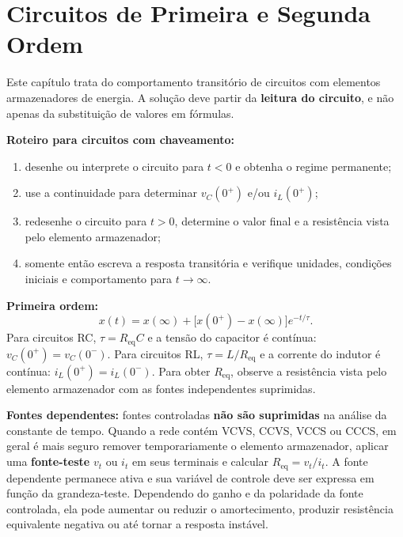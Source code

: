 \section{Circuitos de Primeira e Segunda Ordem}

\begin{conceito}
Este capítulo trata do comportamento transitório de circuitos com elementos
armazenadores de energia. A solução deve partir da \textbf{leitura do circuito},
e não apenas da substituição de valores em fórmulas.

\textbf{Roteiro para circuitos com chaveamento:}
\begin{enumerate}[leftmargin=1.8em,itemsep=2pt,topsep=3pt]
\item desenhe ou interprete o circuito para $t<0$ e obtenha o regime permanente;
\item use a continuidade para determinar $v_C(0^+)$ e/ou $i_L(0^+)$;
\item redesenhe o circuito para $t>0$, determine o valor final e a resistência
      vista pelo elemento armazenador;
\item somente então escreva a resposta transitória e verifique unidades,
      condições iniciais e comportamento para $t\to\infty$.
\end{enumerate}

\textbf{Primeira ordem:}
\[
x(t)=x(\infty)+\big[x(0^+)-x(\infty)\big]e^{-t/\tau}.
\]
Para circuitos RC, $\tau=R_{\mathrm{eq}}C$ e a tensão do capacitor é contínua:
$v_C(0^+)=v_C(0^-)$. Para circuitos RL, $\tau=L/R_{\mathrm{eq}}$ e a corrente do
indutor é contínua: $i_L(0^+)=i_L(0^-)$. Para obter $R_{\mathrm{eq}}$, observe a
resistência vista pelo elemento armazenador com as fontes independentes
suprimidas.

\textbf{Fontes dependentes:} fontes controladas \textbf{não são suprimidas} na
análise da constante de tempo. Quando a rede contém VCVS, CCVS, VCCS ou CCCS, em
geral é mais seguro remover temporariamente o elemento armazenador, aplicar uma
\textbf{fonte-teste} $v_t$ ou $i_t$ em seus terminais e calcular
$R_{\mathrm{eq}}=v_t/i_t$. A fonte dependente permanece ativa e sua variável de
controle deve ser expressa em função da grandeza-teste. Dependendo do ganho e da
polaridade da fonte controlada, ela pode aumentar ou reduzir o amortecimento,
produzir resistência equivalente negativa ou até tornar a resposta instável.


\end{conceito}
